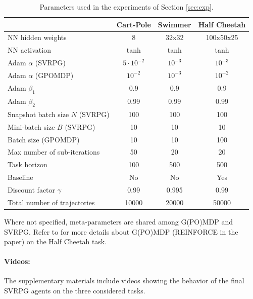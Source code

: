 \documentclass{article}
\theoremstyle{remark}
\theoremstyle{definition}
\begin{document}
\begin{table}[H]\caption{Parameters used in the experiments of Section \ref{sec:exp}.}\label{table:metaparams}
	\centering
	\begin{tabular}{| l | c  c  c |}
		\hline	
		& Cart-Pole & Swimmer & Half Cheetah \\
		\hline
		NN hidden weights & 8 & 32x32 & 100x50x25 \\
		NN activation & tanh & tanh & tanh \\
		Adam $\alpha$ (SVRPG) & $5\cdotp10^{-2}$ & $10^{-3}$ & $10^{-3}$ \\
		Adam $\alpha$ (GPOMDP) & $10^{-2}$ & $10^{-3}$ & $10^{-2}$ \\
		Adam $\beta_1$ & 0.9 & 0.9 & 0.9 \\
		Adam $\beta_2$ & 0.99 & 0.99 & 0.99 \\ 
		Snapshot batch size $N$ (SVRPG) & 100 & 100 & 100 \\
		Mini-batch size $B$ (SVRPG) & 10 & 10 & 10 \\
		Batch size (GPOMDP) & 10 & 10 & 100 \\
		Max number of sub-iterations & 50 & 20 & 20 \\
		Task horizon& 100 & 500 & 500 \\
		Baseline& No & No & Yes \\
		Discount factor $\gamma$& 0.99 & 0.995 & 0.99 \\
		Total number of trajectories& 10000 & 20000 & 50000 \\
		\hline  
	\end{tabular}
\end{table}
Where not specified, meta-parameters are shared among G(PO)MDP and SVRPG.
Refer to \cite{duan2016benchmarking} for more details about G(PO)MDP (REINFORCE in the paper) on the Half Cheetah task.

\paragraph{Videos:} The supplementary materials include videos showing the behavior of the final SVRPG agents on the three considered tasks. 
\end{document}

